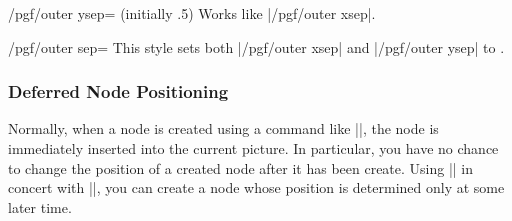 \begin{key}{/pgf/outer ysep= (initially .5\string\pgflinewidth)}
  Works like |/pgf/outer xsep|.
\end{key}

\begin{key}{/pgf/outer sep=}
  This style sets both |/pgf/outer xsep| and |/pgf/outer ysep| to .
\end{key}


\subsubsection{Deferred Node Positioning}

Normally, when a node is created using a command like |\pgfnode|, the
node is immediately inserted into the current picture. In particular,
you have no chance to change the position of a created node after it
has been create. Using |\pgfpositionnodelater| in concert with
|\pgfpositionnodenow|, you can create a node whose position is
determined only at some later time.

